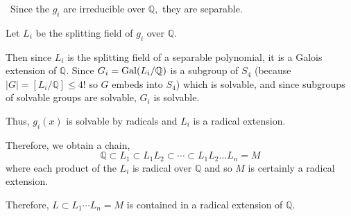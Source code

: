 \documentclass[12pt]{Qual}
\begin{document}
\begin{solution}$\,$
Since the $g_i$ are irreducible over $\mathbb{Q},$ they are separable.

Let $L_i$ be the splitting field of $g_i$ over $\mathbb{Q}$.

Then since $L_i$ is the splitting field of a separable polynomial, it is a Galois extension of $\mathbb{Q}$. Since $G_i=\text{Gal}(L_i/\mathbb{Q})$ is a subgroup of $S_4$ (because $|G|=[L_i/\mathbb{Q}]\le 4!$ so $G$ embeds into $S_4$) which is solvable, and since subgroups of solvable groups are solvable, $G_i$ is solvable.

Thus, $g_i(x)$ is solvable by radicals and $L_i$ is a radical extension.

Therefore, we obtain a chain, $$\mathbb{Q}\subset L_1\subset L_1L_2\subset\cdots\subset L_1L_2\dots L_n=M$$ where each product of the $L_i$ is radical over $\mathbb{Q}$ and so $M$ is certainly a radical extension.

Therefore, $L\subset L_1\cdots L_n=M$ is contained in a radical extension of $\mathbb{Q}.$
\end{solution}
\end{document}
